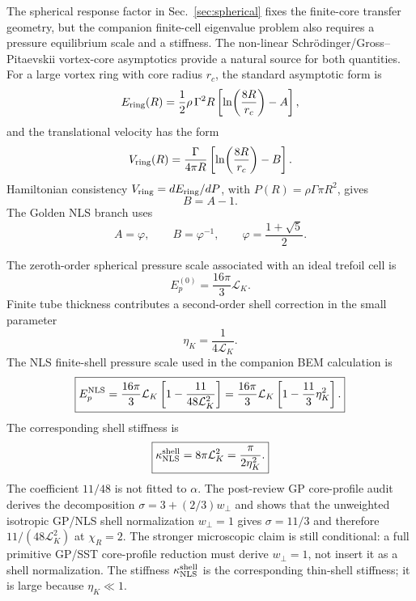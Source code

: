 \documentclass[11pt]{article}
\newcommand{\EpNLS}{E_p^{\rm NLS}}
\newcommand{\kappaNLS}{\kappa_{\rm NLS}^{\rm shell}}
\begin{document}
The spherical response factor in Sec.~\ref{sec:spherical} fixes the finite-core transfer
geometry, but the companion finite-cell eigenvalue problem also requires a pressure
equilibrium scale and a stiffness.  The non-linear Schrödinger/Gross--Pitaevskii vortex-core
asymptotics provide a natural source for both quantities.  For a large vortex ring with core
radius \(r_c\), the standard asymptotic form is
\begin{equation}
  E_{\rm ring}(R)
  =
  \frac{1}{2}\rho\,\Gamma^2 R
  \left[
    \ln\!\left(\frac{8R}{r_c}\right)-A
  \right],
  \label{eq:nls-ring-energy}
\end{equation}
and the translational velocity has the form
\begin{equation}
  V_{\rm ring}(R)
  =
  \frac{\Gamma}{4\pi R}
  \left[
    \ln\!\left(\frac{8R}{r_c}\right)-B
  \right].
  \label{eq:nls-ring-velocity}
\end{equation}
Hamiltonian consistency \(V_{\rm ring}=dE_{\rm ring}/dP\), with
\(P(R)=\rho\Gamma\pi R^2\), gives
\begin{equation}
  B=A-1.
  \label{eq:nls-hamiltonian-constraint}
\end{equation}
The Golden NLS branch uses
\begin{equation}
  A=\varphi,\qquad B=\varphi^{-1},
  \qquad
  \varphi=\frac{1+\sqrt5}{2}.
  \label{eq:golden-branch}
\end{equation}

The zeroth-order spherical pressure scale associated with an ideal trefoil cell is
\begin{equation}
  E_p^{(0)}
  =
  \frac{16\pi}{3}\mathcal L_K.
  \label{eq:Ep0}
\end{equation}
Finite tube thickness contributes a second-order shell correction in the small parameter
\begin{equation}
  \eta_K=\frac{1}{4\mathcal L_K}.
  \label{eq:eta-nls}
\end{equation}
The NLS finite-shell pressure scale used in the companion BEM calculation is
\begin{equation}
  \boxed{
  \EpNLS
  =
  \frac{16\pi}{3}\mathcal L_K
  \left[
  1-\frac{11}{48\mathcal L_K^2}
  \right]
  =
  \frac{16\pi}{3}\mathcal L_K
  \left[
  1-\frac{11}{3}\eta_K^2
  \right].
  }
  \label{eq:EpNLS}
\end{equation}
The corresponding shell stiffness is
\begin{equation}
  \boxed{
  \kappaNLS
  =
  8\pi\mathcal L_K^2
  =
  \frac{\pi}{2\eta_K^2}.
  }
  \label{eq:kappaNLS}
\end{equation}
The coefficient \(11/48\) is not fitted to \(\alpha\).  The post-review
GP core-profile audit derives the decomposition
\(\sigma=3+(2/3)w_\perp\) and shows that the unweighted isotropic GP/NLS shell
normalization \(w_\perp=1\) gives \(\sigma=11/3\) and therefore
\(11/(48\mathcal L_K^2)\) at \(\chi_R=2\).  The stronger microscopic claim is
still conditional: a full primitive GP/SST core-profile reduction must derive
\(w_\perp=1\), not insert it as a shell normalization.  The stiffness
\(\kappa_{\rm NLS}^{\rm shell}\) is the corresponding thin-shell stiffness; it is large
because \(\eta_K\ll1\).
\end{document}
